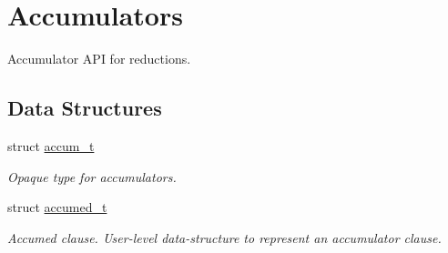 \hypertarget{group__Accumulators}{\section{Accumulators}
\label{group__Accumulators}
}


Accumulator A\-P\-I for reductions.  


\subsection*{Data Structures}
\begin{DoxyCompactItemize}
\item 
struct \hyperlink{structaccum__t}{accum\-\_\-t}
\begin{DoxyCompactList}\small\item\em Opaque type for accumulators. \end{DoxyCompactList}\item 
struct \hyperlink{structaccumed__t}{accumed\-\_\-t}
\begin{DoxyCompactList}\small\item\em Accumed clause. User-\/level data-\/structure to represent an accumulator clause. \end{DoxyCompactList}\end{DoxyCompactItemize}
